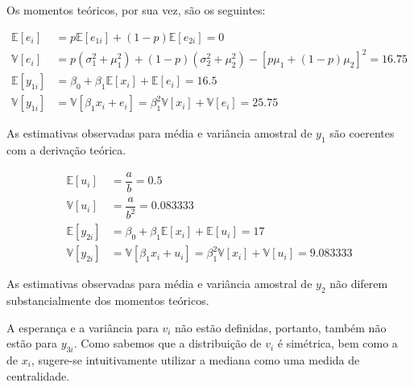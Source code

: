 \documentclass{homework}\usepackage[]{graphicx}\usepackage[]{color}
\begin{document}
Os momentos teóricos, por sua vez, são os seguintes:

\begin{align}
  \mathbb{E}\left[e_i\right] &= p\mathbb{E}\left[e_{1i}\right] + (1-p)\mathbb{E}\left[e_{2i}\right] = 0\\
  \mathbb{V}\left[e_i\right] &= p(\sigma^2_1 + \mu_1^2) + (1-p)(\sigma^2_2 + \mu_2^2) - [p\mu_1 + (1-p)\mu_2]^2 = 16.75\\
  \mathbb{E}\left[y_{1i}\right] &= \beta_0 + \beta_1 \mathbb{E}\left[x_i\right] + \mathbb{E}\left[e_i\right] = 16.5\\
  \mathbb{V}\left[y_{1i}\right] &= \mathbb{V}\left[\beta_1x_i + e_i\right] = \beta_1^2\mathbb{V}\left[x_{i}\right] + \mathbb{V}\left[e_{i}\right] = 25.75
\end{align}

As estimativas observadas para média e variância amostral de $y_{1}$ são coerentes com a derivação teórica.

\begin{align}
  \mathbb{E}\left[u_i\right] &= \dfrac{a}{b} = 0.5\\
  \mathbb{V}\left[u_i\right] &= \dfrac{a}{b^2} = 0.083333\\
  \mathbb{E}\left[y_{2i}\right] &= \beta_0 + \beta_1 \mathbb{E}\left[x_i\right] + \mathbb{E}\left[u_i\right] = 17\\
  \mathbb{V}\left[y_{2i}\right] &= \mathbb{V}\left[\beta_1x_i + u_i\right] = \beta_1^2\mathbb{V}\left[x_{i}\right] + \mathbb{V}\left[u_{i}\right] = 9.083333
\end{align}

As estimativas observadas para média e variância amostral de $y_{2}$ não diferem substancialmente dos momentos teóricos.

A esperança e a variância para $v_i$ não estão definidas, portanto, também não estão para $y_{3i}$. Como sabemos que a distribuição de $v_i$ é simétrica, bem como a de $x_i$, sugere-se intuitivamente utilizar a mediana como uma medida de centralidade.

\question
\end{document}
